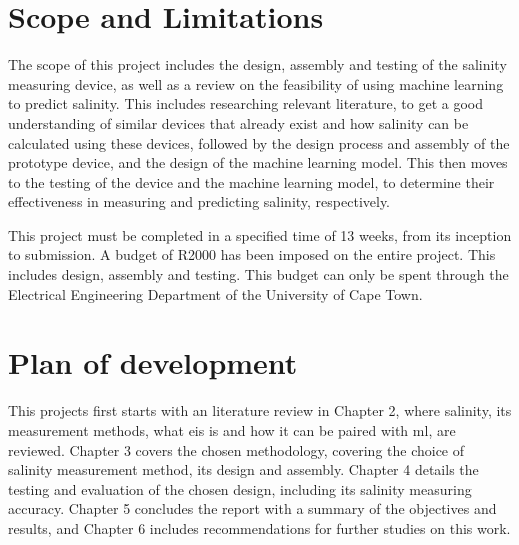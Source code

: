 \section{Scope and Limitations}
The scope of this project includes the design, assembly and testing of the salinity measuring device, as well as a review on the feasibility of using machine learning to predict salinity.
This includes researching relevant literature, to get a good understanding of similar devices that already exist and how salinity can be calculated using these devices, followed by the design process and assembly of the prototype device, and the design of the machine learning model.
This then moves to the testing of the device and the machine learning model, to determine their effectiveness in measuring and predicting salinity, respectively.

This project must be completed in a specified time of 13 weeks, from its inception to submission.
A budget of R2000 has been imposed on the entire project. This includes design, assembly and testing.
This budget can only be spent through the Electrical Engineering Department of the University of Cape Town. 


\section{Plan of development}
This projects first starts with an literature review in Chapter 2, where salinity, its measurement methods, what \gls{eis} is and how it can be paired with \gls{ml}, are reviewed.
Chapter 3 covers the chosen methodology, covering the choice of salinity measurement method, its design and assembly.
Chapter 4 details the testing and evaluation of the chosen design, including its salinity measuring accuracy.
Chapter 5 concludes the report with a summary of the objectives and results, and Chapter 6 includes recommendations for further studies on this work.
